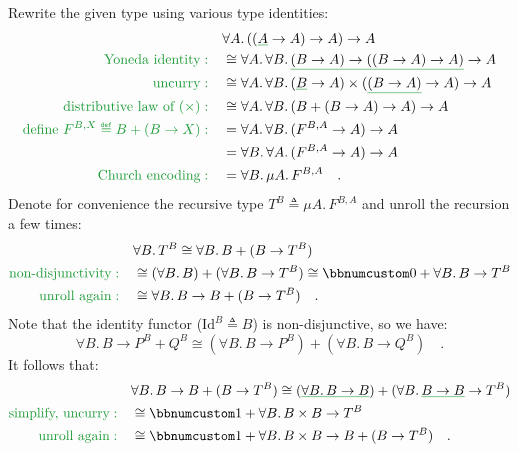 Rewrite the given type using various type identities:
\begin{align*}
 & \forall A.\,((\gunderline A\rightarrow A)\rightarrow A)\rightarrow A\\
{\color{greenunder}\text{Yoneda identity}:}\quad & \cong\forall A.\,\forall B.\,\gunderline{(B\rightarrow A)\rightarrow((B\rightarrow A)\rightarrow A)}\rightarrow A\\
{\color{greenunder}\text{uncurry}:}\quad & \cong\forall A.\,\forall B.\,(\gunderline B\rightarrow A)\times(\gunderline{(B\rightarrow A)}\rightarrow A)\rightarrow A\\
{\color{greenunder}\text{distributive law of }(\times):}\quad & \cong\forall A.\,\forall B.\,(B+(B\rightarrow A)\rightarrow A)\rightarrow A\\
{\color{greenunder}\text{define }F^{B,X}\triangleq B+(B\rightarrow X):}\quad & =\forall A.\,\forall B.\,(F^{B,A}\rightarrow A)\rightarrow A\\
 & =\forall B.\,\forall A.\,(F^{B,A}\rightarrow A)\rightarrow A\\
{\color{greenunder}\text{Church encoding}:}\quad & =\forall B.\,\mu A.\,F^{B,A}\quad.
\end{align*}
Denote for convenience the recursive type $T^{B}\triangleq\mu A.\,F^{B,A}$
and unroll the recursion a few times:
\begin{align*}
 & \forall B.\,T^{B}\cong\forall B.\,B+(B\rightarrow T^{B})\\
{\color{greenunder}\text{non-disjunctivity}:}\quad & \cong(\forall B.\,B)+(\forall B.\,B\rightarrow T^{B})\cong\bbnum 0+\forall B.\,B\rightarrow T^{B}\\
{\color{greenunder}\text{unroll again}:}\quad & \cong\forall B.\,B\rightarrow B+(B\rightarrow T^{B})\quad.
\end{align*}
Note that the identity functor ($\text{Id}^{B}\triangleq B$) is non-disjunctive,
so we have:
\[
\forall B.\,B\rightarrow P^{B}+Q^{B}\cong(\forall B.\,B\rightarrow P^{B})+(\forall B.\,B\rightarrow Q^{B})\quad.
\]
It follows that:
\begin{align*}
 & \forall B.\,B\rightarrow B+(B\rightarrow T^{B})\cong(\gunderline{\forall B.\,B\rightarrow B})+(\forall B.\,\gunderline{B\rightarrow B}\rightarrow T^{B})\\
{\color{greenunder}\text{simplify, uncurry}:}\quad & \cong\bbnum 1+\forall B.\,B\times B\rightarrow T^{B}\\
{\color{greenunder}\text{unroll again}:}\quad & \cong\bbnum 1+\forall B.\,B\times B\rightarrow B+(B\rightarrow T^{B})\quad.
\end{align*}
